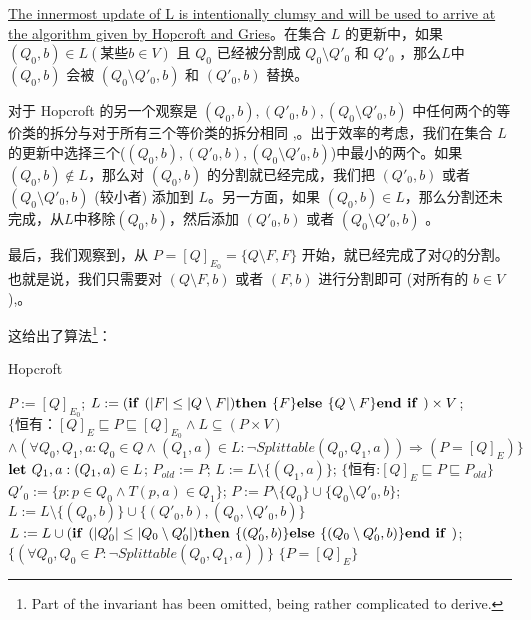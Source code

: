 \uline{The innermost update of L is intentionally clumsy and will be used to arrive at the algorithm given by Hopcroft and Gries}。在集合 $L$ 的更新中，如果 $ (Q_0,b) \in L (\mbox{某些}b \in V) $ 且 $Q_0$ 已经被分割成 $ Q_0 \setminus Q'_0 $ 和 $ Q'_0 $ ，那么$L$中 $(Q_0,b)$ 会被 $ (Q_0 \setminus Q'_0 ,b) $ 和 $ (Q'_0 ,b) $ 替换。

对于 Hopcroft 的另一个观察是 $ (Q_0,b),(Q'_0,b) ,(Q_0 \setminus Q'_0,b) $ 中任何两个的等价类的拆分与对于所有三个等价类的拆分相同 \cite[pp. 190-191]{Hopc71},\cite[引理 6]{Grie73}。出于效率的考虑，我们在集合 $L$ 的更新中选择三个($ (Q_0,b),(Q'_0,b) ,(Q_0 \setminus Q'_0,b) $)中最小的两个。如果 $(Q_0,b) \not\in L$，那么对 $(Q_0,b)$ 的分割就已经完成，我们把 $ (Q'_0,b) $ 或者  $ (Q_0 \setminus Q'_0,b) $ (较小者) 添加到 $L$。另一方面，如果  $(Q_0,b) \in L$，那么分割还未完成，从$L$中移除$(Q_0,b)$，然后添加 $ (Q'_0,b) $ 或者  $ (Q_0 \setminus Q'_0,b) $ 。

最后，我们观察到，从 $ P= [Q]_{E_0} = \{ Q \setminus F,F \} $ 开始，就已经完成了对$Q$的分割。也就是说，我们只需要对 $ ( Q \setminus F,b ) $ 或者 $ (F,b) $ 进行分割即可 (对所有的 $b\in V$)\cite[pp. 190-191]{Hopc71},\cite[引理 6]{Grie73}。

这给出了算法\footnote{Part of the invariant has been omitted, being rather complicated to derive.}：

\begin{algorithm}
    \caption{Hopcroft}\label{al:4-8}
    \small
    \begin{algorithmic}[1]
        \State $P:=[Q]_{E_0}$;
        \State $L:= ( \mbox{\textbf{if }} ( |F| \leq |Q \setminus F | ) \mbox{\textbf{then }} \{F\} \mbox{\textbf{else }} \{ Q \setminus F \} \mbox{\textbf{end if }} ) \times V $;
        \State $\{ \mbox{恒有：} [Q]_E \sqsubseteq P \sqsubseteq [Q]_{E_0} \land L \subseteq (P \times V) $
        \State \quad $ \land (\forall Q_0,Q_1,a:Q_0 \in Q \land (Q_1,a) \in L : \neg Splittable (Q_0,Q_1,a)) \Rightarrow (P=[Q]_E) \} $
            \State $ \mbox{\textbf{let }} Q_1,a:(Q_1,a) \in L $;
            \State $ P_{old} := P $;
            \State $ L := L \setminus \{ (Q_1,a) \} $;
            \State $ \{ \mbox{恒有:} [Q]_E \sqsubseteq P \sqsubseteq P_{old} \} $
                \State $ Q'_0 := \{ p:p \in Q_0 \land T(p,a) \in Q_1 \} $;
                \State $ P:= P \setminus \{ Q_0 \} \cup \{ Q_0 \setminus Q'_0,b \} $;
                       $ L := L \setminus \{ (Q_0,b) \} \cup \{ (Q'_0,b),(Q_0, \setminus Q'_0,b ) \} $
                        \State $L:= L \cup ( \mbox{\textbf{if }} ( |Q'_0| \leq |Q_0 \setminus Q'_0 | ) \mbox{\textbf{then }} \{(Q'_0,b)\} \mbox{\textbf{else }} \{ (Q_0 \setminus Q'_0,b) \} \mbox{\textbf{end if }} ) $;
                    \EndIf
                \EndFor
            \EndFor
            \State $ \{ (\forall Q_0,Q_0 \in P : \neg Splittable(Q_0,Q_1,a)) \} $
        \Until $\{ P = [Q]_E \}$
    \end{algorithmic}
\end{algorithm}


